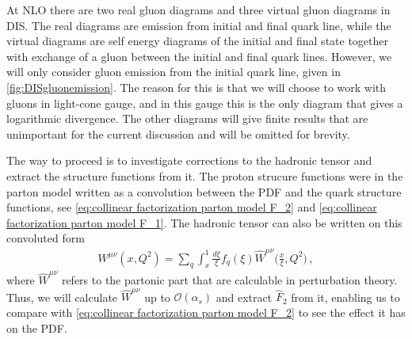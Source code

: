 At NLO there are two real gluon diagrams and three virtual gluon diagrams in DIS. The real diagrams are emission from initial and final quark line, while the virtual diagrams are self energy diagrams of the initial and final state together with exchange of a gluon between the initial and final quark lines.
However, we will only consider gluon emission from the initial quark line, given in \cref{fig:DISgluonemission}. The reason for this is that we will choose to work with gluons in light-cone gauge, and in this gauge this is the only diagram that gives a logarithmic divergence. The other diagrams will give finite results that are unimportant for the current discussion and will be omitted for brevity.

\medskip
The way to proceed is to investigate corrections to the hadronic tensor and extract the structure functions from it. The proton strucure functions were in the parton model written as a convolution between the PDF and the quark structure functions, see \cref{eq:collinear factorization parton model F_2} and \cref{eq:collinear factorization parton model F_1}. The hadronic tensor can also be written on this convoluted form
\begin{align}
    W^{\mu\nu}(x,Q^{2})=\sum_{q}\int_{x}^{1}\frac{d\xi}{\xi}f_{q}(\xi)\hat{W}^{\mu\nu}\Big(\frac{x}{\xi},Q^{2}\Big)\,,
\end{align}
where $\hat{W}^{\mu\nu}$ refers to the partonic part that are calculable in perturbation theory. Thus, we will calculate $\hat{W}^{\mu\nu}$ up to $\mathcal{O}(\alpha_s)$ and extract $\hat{F}_{2}$ from it, enabling us to compare with \cref{eq:collinear factorization parton model F_2} to see the effect it has on the PDF.

